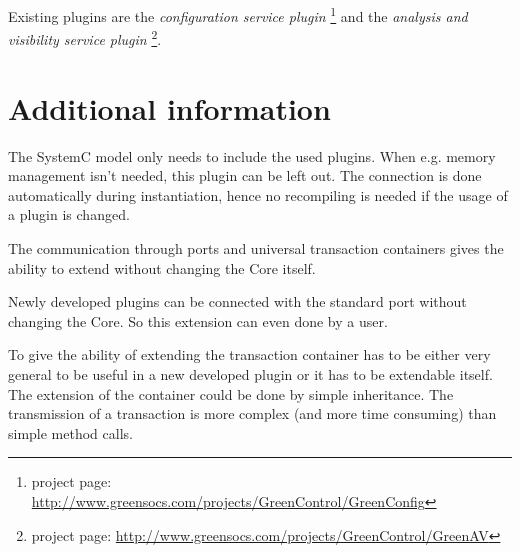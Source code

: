 Existing plugins are the {\em configuration service plugin} \GreenConfig\footnote{\GreenConfig project page:  \href{http://www.greensocs.com/projects/GreenControl/GreenConfig}{http://www.greensocs.com/projects/GreenControl/GreenConfig}} and the {\em analysis and visibility service plugin} \GreenAV\footnote{\GreenAV project page:  \href{http://www.greensocs.com/projects/GreenControl/GreenAV}{http://www.greensocs.com/projects/GreenControl/GreenAV}}. 



\section{Additional information}

The SystemC model only needs to include the used plugins. When e.g. memory management isn't needed, this plugin can be left out. The connection is done automatically during instantiation, hence no recompiling is needed if the usage of a plugin is changed. 

The communication through ports and universal transaction containers gives the ability to extend \GreenControl without changing the Core itself. 

Newly developed plugins can be connected with the standard port without changing the \GreenControl Core. So this extension can even done by a user. 

To give the ability of extending \GreenControl the transaction
container has to be either very general to be useful in a new
developed plugin or it has to be extendable itself. The extension of
the container could be done by simple inheritance. 
The transmission of a transaction is more complex (and more time consuming) than simple method calls.
